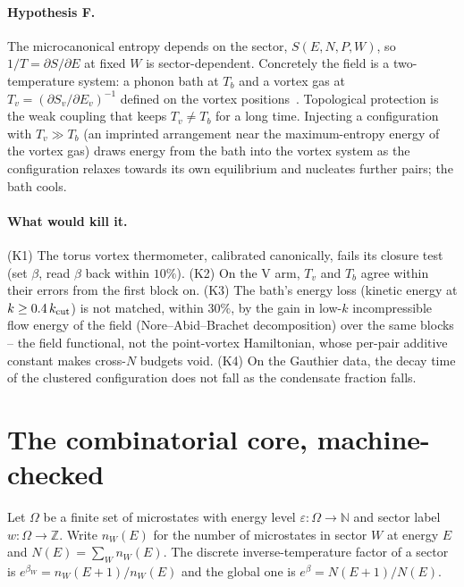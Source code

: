 \documentclass[11pt,a4paper]{article}
\begin{document}
\paragraph{Hypothesis F.} The microcanonical entropy depends on the sector, $S(E,N,P,W)$, so
$1/T=\partial S/\partial E$ at fixed $W$ is sector-dependent. Concretely the field is a two-temperature
system: a phonon bath at $T_b$ and a vortex gas at $T_v=(\partial S_v/\partial E_v)^{-1}$ defined on the
vortex positions~\cite{Onsager1949}. Topological protection is the weak coupling that keeps $T_v\ne T_b$
for a long time. Injecting a configuration with $T_v\gg T_b$ (an imprinted arrangement near the
maximum-entropy energy of the vortex gas) draws energy from the bath into the vortex system as the
configuration relaxes towards its own equilibrium and nucleates further pairs; the bath cools.

\paragraph{What would kill it.} (K1) The torus vortex thermometer, calibrated canonically, fails its
closure test (set $\beta$, read $\beta$ back within $10\%$). (K2) On the V arm, $T_v$ and $T_b$ agree
within their errors from the first block on. (K3) The bath's energy loss (kinetic energy at $k\ge0.4\,k_{\rm cut}$) is not matched, within $30\%$, by the gain
in low-$k$ incompressible flow energy of the field (Nore--Abid--Brachet decomposition) over the same blocks -- the
field functional, not the point-vortex Hamiltonian, whose per-pair additive constant makes cross-$N$ budgets void. (K4) On the Gauthier data, the decay time of the
clustered configuration does not fall as the condensate fraction falls.

\section{The combinatorial core, machine-checked}

Let $\Omega$ be a finite set of microstates with energy level $\varepsilon:\Omega\to\mathbb N$ and sector
label $w:\Omega\to\mathbb Z$. Write $n_W(E)$ for the number of microstates in sector $W$ at energy $E$ and
$N(E)=\sum_W n_W(E)$. The discrete inverse-temperature factor of a sector is $e^{\beta_W}=n_W(E+1)/n_W(E)$
and the global one is $e^{\beta}=N(E+1)/N(E)$.
\end{document}
